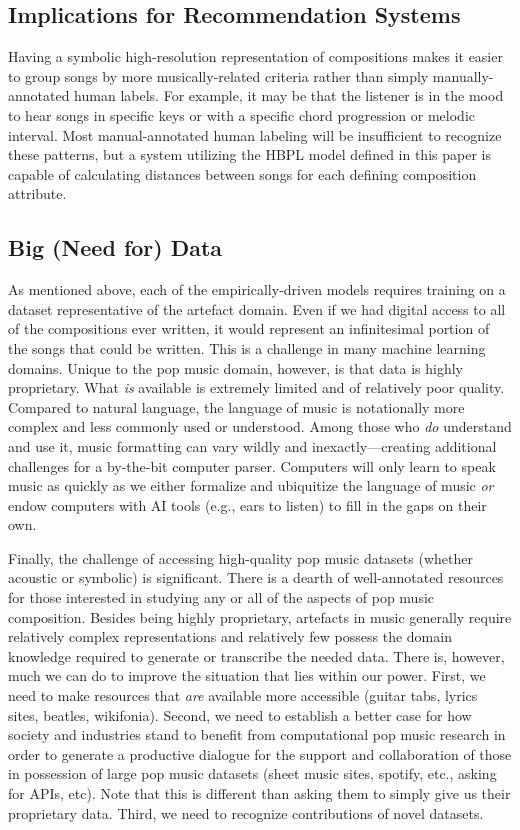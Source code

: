 \documentclass[letterpaper]{article}
\begin{document}
\subsection{Implications for Recommendation Systems}

Having a symbolic high-resolution representation of compositions makes it easier to group songs by more musically-related criteria rather than simply manually-annotated human labels. For example, it may be that the listener is in the mood to hear songs in specific keys or with a specific chord progression or melodic interval. Most manual-annotated human labeling will be insufficient to recognize these patterns, but a system utilizing the HBPL model defined in this paper is capable of calculating distances between songs for each defining composition attribute.

\subsection{Big (Need for) Data}

As mentioned above, each of the empirically-driven models requires training on a dataset representative of the artefact domain. Even if we had digital access to all of the compositions ever written, it would represent an infinitesimal portion of the songs that could be written. This is a challenge in many machine learning domains. Unique to the pop music domain, however, is that data is highly proprietary. What \textit{is} available is extremely limited and of relatively poor quality. Compared to natural language, the language of music is notationally more complex and less commonly used or understood. Among those who \textit{do} understand and use it, music formatting can vary wildly and inexactly---creating additional challenges for a by-the-bit computer parser. Computers will only learn to speak music as quickly as we either formalize and ubiquitize the language of music \textit{or} endow computers with AI tools (e.g., ears to listen) to fill in the gaps on their own.

Finally, the challenge of accessing high-quality pop music datasets (whether acoustic or symbolic) is significant. There is a dearth of well-annotated resources for those interested in studying any or all of the aspects of pop music composition. Besides being highly proprietary, artefacts in music generally require relatively complex representations and relatively few possess the domain knowledge required to generate or transcribe the needed data. There is, however, much we can do to improve the situation that lies within our power. First, we need to make resources that \textit{are} available more accessible (guitar tabs, lyrics sites, beatles, wikifonia). Second, we need to establish a better case for how society and industries stand to benefit from computational pop music research in order to generate a productive dialogue for the support and collaboration of those in possession of large pop music datasets (sheet music sites, spotify, etc., asking for APIs, etc). Note that this is different than asking them to simply give us their proprietary data. Third, we need to recognize contributions of novel datasets.
\end{document}
